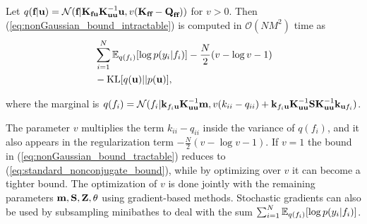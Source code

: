\begin{proposition} Let \emph{$q(\textbf{f}|\textbf{u}) = \mathcal{N}(\textbf{f} | \textbf{K}_{\textbf{f} \textbf{u}} \textbf{K}_{\textbf{u} \textbf{u}}^{-1} \textbf{u}, v (\textbf{K}_{\textbf{f} \textbf{f}} - \textbf{Q}_{\textbf{f} \textbf{f}}))$} for \emph{$v>0$}. Then (\ref{eq:nonGaussian_bound_intractable}) is computed in \emph{$\mathcal{O}(N M^2)$} time as 
\emph{\begin{align}
& \sum_{i=1}^N 
\mathbb{E}_{q(f_i)} [\log p(y_i | f_i)] -  
 \frac{N}{2} (v - \log v - 1)
\nonumber \\ & - \text{KL}[q(\textbf{u}) || p(\textbf{u})],
\label{eq:nonGaussian_bound_tractable}
\end{align}}

\noindent where the marginal is \emph{$q(f_i)  = \mathcal{N}(f_i | \textbf{k}_{f_i \textbf{u}} \textbf{K}_{\textbf{u} \textbf{u}}^{-1} \textbf{m}, v (k_{ii} - q_{ii}) + \textbf{k}_{f_i \textbf{u}} \textbf{K}_{\textbf{u} \textbf{u}}^{-1} \textbf{S} \textbf{K}_{\textbf{u} \textbf{u}}^{-1} \textbf{k}_{\textbf{u} f_i})$}. 
\end{proposition}
The parameter $v$ multiplies the term 
$k_{ii} - q_{ii}$  inside the variance of 
$q(f_i)$, and it also appears in the regularization term
$-\frac{N}{2} (v - \log v - 1)$. If $v=1$ the bound 
in (\ref{eq:nonGaussian_bound_tractable}) reduces to 
(\ref{eq:standard_nonconjugate_bound}), while by
optimizing over $v$ it can become a tighter bound. 
The optimization 
of $v$ is done jointly  
with the remaining parameters $\textbf{m},\textbf{S}, \textbf{Z}, \theta$ using gradient-based methods. Stochastic gradients can also be used 
by subsampling minibathes 
to deal with the sum  
$\sum_{i=1}^N 
\mathbb{E}_{q(f_i)} [\log p(y_i | f_i)]$.

